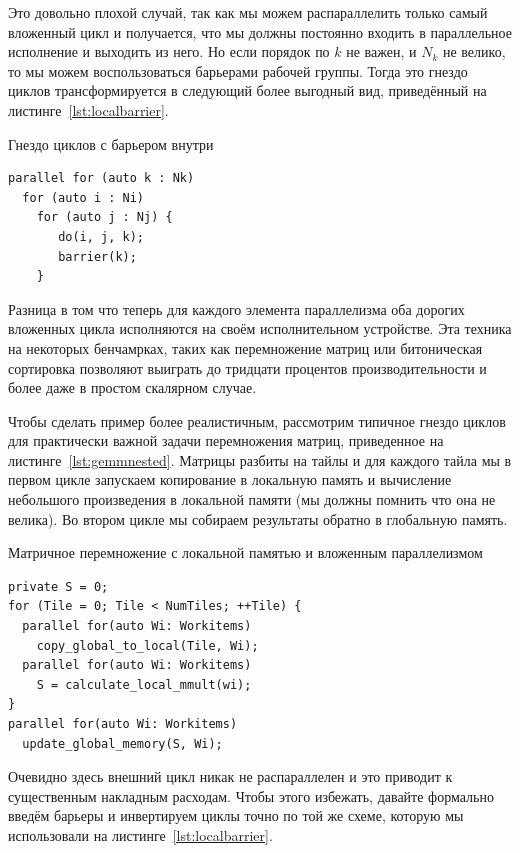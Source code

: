 Это довольно плохой случай, так как мы можем распараллелить только самый вложенный цикл и получается, что мы должны постоянно входить в параллельное исполнение и выходить из него. Но если порядок по $k$ не важен, и $N_k$ не велико, то мы можем воспользоваться барьерами рабочей группы. Тогда это гнездо циклов трансформируется в следующий более выгодный вид, приведённый на листинге~\cref{lst:localbarrier}.

\begin{ListingEnv}[!h]
    \captiondelim{ } 
    \caption{Гнездо циклов с барьером внутри}\label{lst:localbarrier}
    \begin{lstlisting}[language={[ISO]C++}]
parallel for (auto k : Nk)
  for (auto i : Ni)
    for (auto j : Nj) {
       do(i, j, k);
       barrier(k);
    }
    \end{lstlisting}
\end{ListingEnv}

Разница в том что теперь для каждого элемента параллелизма оба дорогих вложенных цикла исполняются на своём исполнительном устройстве. Эта техника на некоторых бенчамрках, таких как перемножение матриц или битоническая сортировка позволяют выиграть до тридцати процентов производительности и более даже в простом скалярном случае.

Чтобы сделать пример более реалистичным, рассмотрим типичное гнездо циклов для практически важной задачи перемножения матриц, приведенное на листинге~\cref{lst:gemmnested}. Матрицы разбиты на тайлы и для каждого тайла мы в первом цикле запускаем копирование в локальную память и вычисление небольшого произведения в локальной памяти (мы должны помнить что она не велика). Во втором цикле мы собираем результаты обратно в глобальную память.

\begin{ListingEnv}[!h]
    \captiondelim{ } 
    \caption{Матричное перемножение с локальной памятью и вложенным параллелизмом}\label{lst:gemmnested}
    \begin{lstlisting}[language={[ISO]C++}]
private S = 0;
for (Tile = 0; Tile < NumTiles; ++Tile) {
  parallel for(auto Wi: Workitems)
    copy_global_to_local(Tile, Wi); 
  parallel for(auto Wi: Workitems)
    S = calculate_local_mmult(wi);
}
parallel for(auto Wi: Workitems)
  update_global_memory(S, Wi); 
    \end{lstlisting}
\end{ListingEnv}

Очевидно здесь внешний цикл никак не распараллелен и это приводит к существенным накладным расходам. Чтобы этого избежать, давайте формально введём барьеры и инвертируем циклы точно по той же схеме, которую мы использовали на листинге~\cref{lst:localbarrier}.

